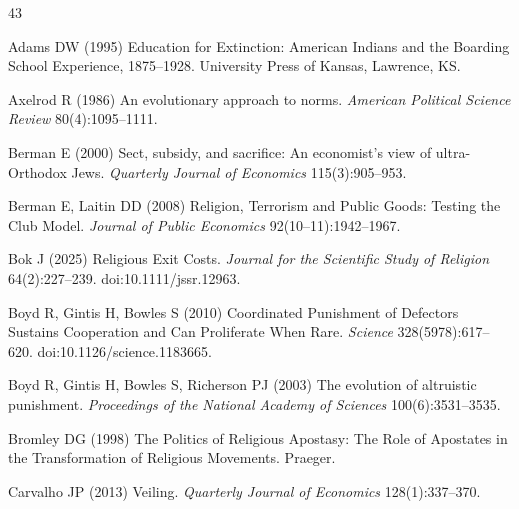 \documentclass[12pt]{article}
\begin{document}
%
\begin{thebibliography}{43}

Adams DW (1995) Education for Extinction: American Indians and the Boarding School Experience, 1875--1928. University Press of Kansas, Lawrence, KS.

Axelrod R (1986) An evolutionary approach to norms. \textit{American Political Science Review} 80(4):1095--1111.

Berman E (2000) Sect, subsidy, and sacrifice: An economist's view of ultra-Orthodox Jews. \textit{Quarterly Journal of Economics} 115(3):905--953.

Berman E, Laitin DD (2008) Religion, Terrorism and Public Goods: Testing the Club Model. \textit{Journal of Public Economics} 92(10--11):1942--1967.

Bok J (2025) Religious Exit Costs. \textit{Journal for the Scientific Study of Religion} 64(2):227--239. doi:10.1111/jssr.12963.

Boyd R, Gintis H, Bowles S (2010) Coordinated Punishment of Defectors Sustains Cooperation and Can Proliferate When Rare. \textit{Science} 328(5978):617--620. doi:10.1126/science.1183665.

Boyd R, Gintis H, Bowles S, Richerson PJ (2003) The evolution of altruistic punishment. \textit{Proceedings of the National Academy of Sciences} 100(6):3531--3535.

Bromley DG (1998) The Politics of Religious Apostasy: The Role of Apostates in the Transformation of Religious Movements. Praeger.

Carvalho JP (2013) Veiling. \textit{Quarterly Journal of Economics} 128(1):337--370.


\end{thebibliography}
\end{document}
